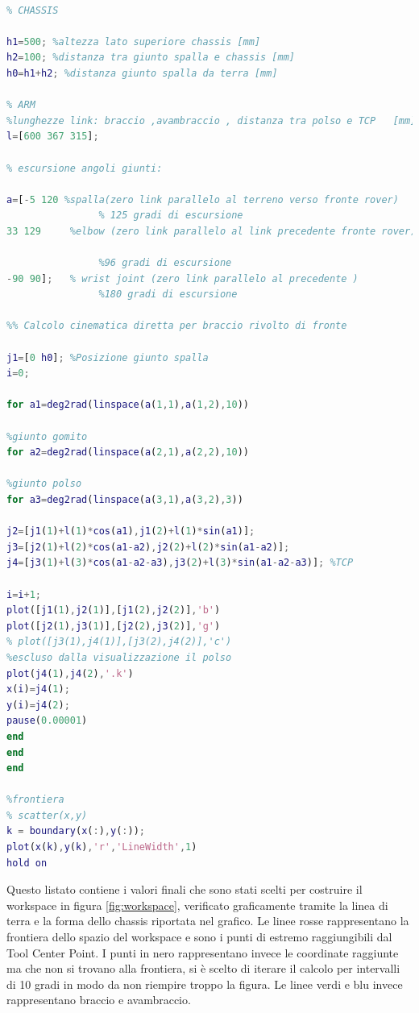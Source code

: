 \documentclass[%
corpo=11pt,
twoside,
 stile=classica,
oldstyle,
greek,%
]{toptesi}
\begin{document}
\begin{lstlisting}[language=Matlab]
%%% Dati Rover per il calcolo del workspace%%%

% CHASSIS
 
h1=500; %altezza lato superiore chassis [mm]
h2=100; %distanza tra giunto spalla e chassis [mm]
h0=h1+h2; %distanza giunto spalla da terra [mm]

% ARM
%lunghezze link: braccio ,avambraccio , distanza tra polso e TCP   [mm]
l=[600 367 315];

% escursione angoli giunti: 

a=[-5 120 %spalla(zero link parallelo al terreno verso fronte rover)
                % 125 gradi di escursione
33 129     %elbow (zero link parallelo al link precedente fronte rover)
 
	            %96 gradi di escursione
-90 90];   % wrist joint (zero link parallelo al precedente ) 
                %180 gradi di escursione

%% Calcolo cinematica diretta per braccio rivolto di fronte

j1=[0 h0]; %Posizione giunto spalla
i=0;

for a1=deg2rad(linspace(a(1,1),a(1,2),10)) 

%giunto gomito
for a2=deg2rad(linspace(a(2,1),a(2,2),10))

%giunto polso
for a3=deg2rad(linspace(a(3,1),a(3,2),3))

j2=[j1(1)+l(1)*cos(a1),j1(2)+l(1)*sin(a1)];
j3=[j2(1)+l(2)*cos(a1-a2),j2(2)+l(2)*sin(a1-a2)];
j4=[j3(1)+l(3)*cos(a1-a2-a3),j3(2)+l(3)*sin(a1-a2-a3)]; %TCP

i=i+1; 
plot([j1(1),j2(1)],[j1(2),j2(2)],'b')
plot([j2(1),j3(1)],[j2(2),j3(2)],'g')
% plot([j3(1),j4(1)],[j3(2),j4(2)],'c')
%escluso dalla visualizzazione il polso 
plot(j4(1),j4(2),'.k')
x(i)=j4(1);
y(i)=j4(2);
pause(0.00001)
end         
end
end 

%frontiera
% scatter(x,y)
k = boundary(x(:),y(:));
plot(x(k),y(k),'r','LineWidth',1)
hold on

\end{lstlisting}

Questo listato contiene i valori finali che sono stati scelti per costruire il workspace in figura \ref{fig:workspace}, verificato graficamente tramite la linea di terra e la forma dello chassis riportata nel grafico. Le linee rosse rappresentano la frontiera dello spazio del workspace e sono i punti di estremo raggiungibili dal Tool Center Point. I punti in nero rappresentano invece le coordinate raggiunte ma che non si trovano alla frontiera, si è scelto di iterare il calcolo per intervalli di 10 gradi in modo da non riempire troppo la figura. Le linee verdi e blu invece rappresentano braccio e avambraccio.
\end{document}
